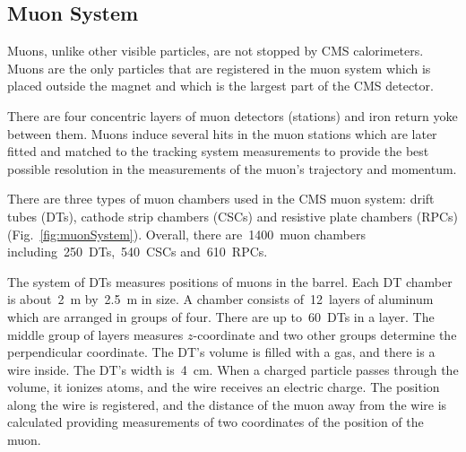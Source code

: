 \subsection{Muon System}

Muons, unlike other visible particles, are not stopped by CMS calorimeters. Muons are the only particles that are registered in the muon system which is placed outside the magnet and which is the largest part of the CMS detector.

There are four concentric layers of muon detectors (stations) and iron return yoke between them. Muons induce several hits in the muon stations which are later fitted and matched to the tracking system measurements to provide the best possible resolution in the measurements of the muon's trajectory and momentum.

There are three types of muon chambers used in the CMS muon system: drift tubes (DTs), cathode strip chambers (CSCs) and resistive plate chambers (RPCs) (Fig.~\ref{fig:muonSystem}). Overall, there are~1400~muon chambers including~250~DTs,~540~CSCs and~610~RPCs.

The system of DTs measures positions of muons in the barrel. Each DT chamber is about~2~m by~2.5~m in size. A chamber consists of~12~layers of aluminum which are arranged in groups of four. There are up to~60~DTs in a layer. The middle group of layers measures $z$-coordinate and two other groups determine the perpendicular coordinate. The DT's volume is filled with a gas, and there is a wire inside. The DT's width is~4~cm. When a charged particle passes through the volume, it ionizes atoms, and the wire receives an electric charge. The position along the wire is registered, and the distance of the muon away from the wire is calculated providing measurements of two coordinates of the position of the muon.

